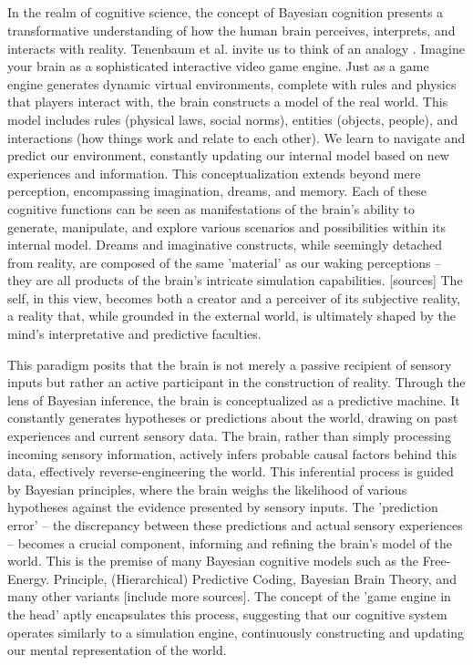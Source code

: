 \subsection{}

In the realm of cognitive science, the concept of Bayesian cognition presents a transformative understanding of how the human brain perceives, interprets, and interacts with reality.
Tenenbaum et al. invite us to think of an analogy \cite{Ullman_Spelke_Battaglia_Tenenbaum_2017, Lake_Ullman_Tenenbaum_Gershman_2017, rule_child_2020}.
Imagine your brain as a sophisticated interactive video game engine. Just as a game engine generates dynamic virtual environments, complete with rules and physics that players interact with, the brain constructs a model of the real world. This model includes rules (physical laws, social norms), entities (objects, people), and interactions (how things work and relate to each other). We learn to navigate and predict our environment, constantly updating our internal model based on new experiences and information.
This conceptualization extends beyond mere perception, encompassing imagination, dreams, and memory. Each of these cognitive functions can be seen as manifestations of the brain's ability to generate, manipulate, and explore various scenarios and possibilities within its internal model. Dreams and imaginative constructs, while seemingly detached from reality, are composed of the same 'material' as our waking perceptions – they are all products of the brain's intricate simulation capabilities. [sources]
The self, in this view, becomes both a creator and a perceiver of its subjective reality, a reality that, while grounded in the external world, is ultimately shaped by the mind's interpretative and predictive faculties.

This paradigm posits that the brain is not merely a passive recipient of sensory inputs but rather an active participant in the construction of reality. Through the lens of Bayesian inference, the brain is conceptualized as a predictive machine. It constantly generates hypotheses or predictions about the world, drawing on past experiences and current sensory data. The brain, rather than simply processing incoming sensory information, actively infers probable causal factors behind this data, effectively reverse-engineering the world. This inferential process is guided by Bayesian principles, where the brain weighs the likelihood of various hypotheses against the evidence presented by sensory inputs. The 'prediction error' – the discrepancy between these predictions and actual sensory experiences – becomes a crucial component, informing and refining the brain's model of the world. This is the premise of many Bayesian cognitive models such as the Free-Energy. Principle, (Hierarchical) Predictive Coding, Bayesian Brain Theory, and many other variants \cite{friston_free-energy_2010, friston_world_2021} [include more sources].
The concept of the 'game engine in the head' aptly encapsulates this process, suggesting that our cognitive system operates similarly to a simulation engine, continuously constructing and updating our mental representation of the world.


